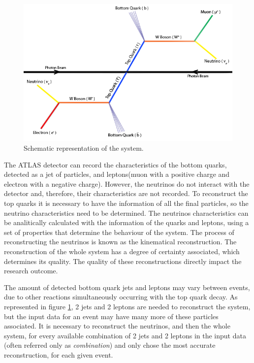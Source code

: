 \begin{figure}[!htp]
	\begin{center}
		\includegraphics[scale=0.6]{../../common/img/ttbar.png}
		\caption{Schematic representation of the \ttbar system.}
		\label{fig:TopQuarkDecay}
	\end{center}
\end{figure}

The ATLAS detector can record the characteristics of the bottom quarks, detected as a jet of particles, and leptons(muon with a positive charge and electron with a negative charge). However, the neutrinos do not interact with the detector and, therefore, their characteristics are not recorded. To reconstruct the top quarks it is necessary to have the information of all the final particles, so the neutrino characteristics need to be determined. The neutrinos characteristics can be analitically calculated with the information of the quarks and leptons, using a set of properties that determine the behaviour of the \ttbar system. The process of reconstructing the neutrinos is known as the kinematical reconstruction. The reconstruction of the whole \ttbar system has a degree of certainty associated, which determines its quality. The quality of these reconstructions directly impact the research outcome.

The amount of detected bottom quark jets and leptons may vary between events, due to other reactions simultaneously occurring with the top quark decay. As represented in figure \ref{fig:TopQuarkDecay}, 2 jets and 2 leptons are needed to reconstruct the \ttbar system, but the input data for an event may have many more of these particles associated. It is necessary to reconstruct the neutrinos, and then the whole system, for every available combination of 2 jets and 2 leptons in the input data (often referred only as \textit{combination}) and only chose the most accurate reconstruction, for each given event.

